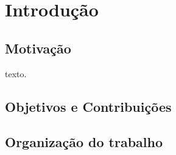 \chapter*{Introdução}

\section{Motivação}
    \noindent texto.
    
\section{Objetivos e Contribuições}

\section{Organização do trabalho}

